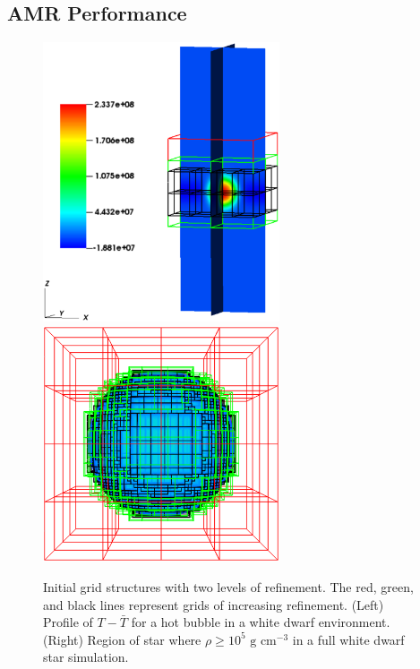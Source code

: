 \subsection{AMR Performance}

\begin{figure}[htb]
\begin{center}
\includegraphics[width=2.75in]{./figs/reacting_bubble_amr} 
$\qquad$
\includegraphics[width=2.75in]{./figs/wdconvect_amr_3grid}
\caption{\label{fig:amr_grids} Initial grid structures with two levels of refinement. 
         The red, green, and black lines represent grids of increasing refinement. 
         (Left) Profile of $T - \bar{T}$ for a hot bubble in a white dwarf environment.
         (Right) Region of star where $\rho\ge 10^5 \text{ g cm}^{-3}$ in a full white dwarf star simulation. }
\end{center}
\end{figure}

